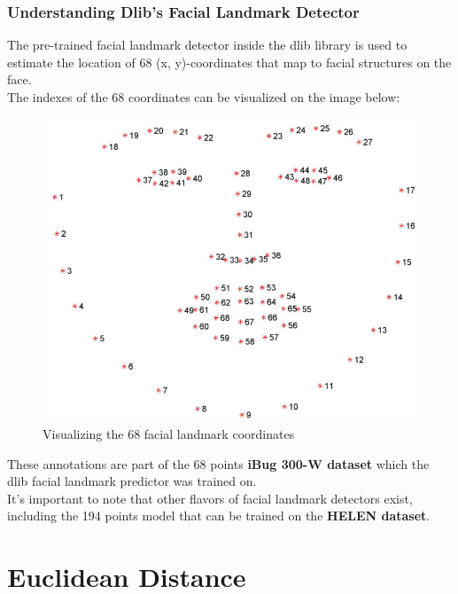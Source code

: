         \subsubsection{Understanding Dlib's Facial Landmark Detector}
        The pre-trained facial landmark detector inside the dlib library is used to estimate the location of 68 (x, y)-coordinates that map to facial structures on the face. \\
        \vspace{3mm}
        The indexes of the 68 coordinates can be visualized on the image below:
        \begin{figure}[H]
            \centering
            \includegraphics[width=0.6\linewidth]{img/landmark.png}
            \caption{Visualizing the 68 facial landmark coordinates}
        \end{figure}
        These annotations are part of the 68 points \textbf{iBug 300-W dataset} which the dlib facial landmark predictor was trained on. \\ 
        \vspace{3mm}
        It’s important to note that other flavors of facial landmark detectors exist, including the 194 points model that can be trained on the \textbf{HELEN dataset}.

\section{Euclidean Distance}
